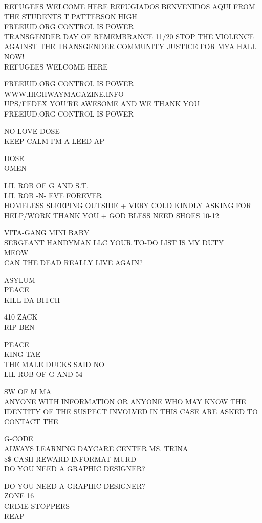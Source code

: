 \documentclass[10pt,letterpaper]{article}
\begin{document}
REFUGEES WELCOME HERE REFUGIADOS BENVENIDOS AQUI FROM THE STUDENTS T PATTERSON HIGH\\
FREEIUD.ORG CONTROL IS POWER\\
TRANSGENDER DAY OF REMEMBRANCE 11/20 STOP THE VIOLENCE AGAINST THE TRANSGENDER COMMUNITY JUSTICE FOR MYA HALL NOW!\\
REFUGEES WELCOME HERE

FREEIUD.ORG CONTROL IS POWER\\
WWW.HIGHWAYMAGAZINE.INFO\\
UPS/FEDEX YOU'RE AWESOME AND WE THANK YOU\\
FREEIUD.ORG CONTROL IS POWER

NO LOVE DOSE\\
KEEP CALM I'M A LEED AP

DOSE\\
OMEN

LIL ROB OF G AND S.T.\\
LIL ROB {-}N{-} EVE FOREVER\\
HOMELESS SLEEPING OUTSIDE + VERY COLD KINDLY ASKING FOR HELP/WORK THANK YOU + GOD BLESS NEED SHOES 10{-}12

VITA{-}GANG MINI BABY\\
SERGEANT HANDYMAN LLC YOUR TO{-}DO LIST IS MY DUTY\\
MEOW\\
CAN THE DEAD REALLY LIVE AGAIN?

ASYLUM\\
PEACE\\
KILL DA BITCH

410 ZACK\\
RIP BEN

PEACE\\
KING TAE\\
THE MALE DUCKS SAID NO\\
LIL ROB OF G AND 54

SW OF M MA\\
ANYONE WITH INFORMATION OR ANYONE WHO MAY KNOW THE IDENTITY OF THE SUSPECT INVOLVED IN THIS CASE ARE ASKED TO CONTACT THE

G{-}CODE\\
ALWAYS LEARNING DAYCARE CENTER MS. TRINA\\
\$\$ CASH REWARD INFORMAT MURD\\
DO YOU NEED A GRAPHIC DESIGNER?

DO YOU NEED A GRAPHIC DESIGNER?\\
ZONE 16\\
CRIME STOPPERS\\
REAP
\end{document}
